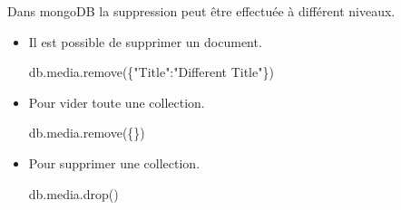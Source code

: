    Dans mongoDB la suppression peut être effectuée à différent niveaux. 
\begin{itemize}
    \item Il est possible de supprimer un document. \newline
    \begin{tt} db.media.remove(\{"Title":"Different Title"\}) \end{tt} 
    
    \item Pour vider toute une collection. \newline
    \begin{tt} db.media.remove(\{\})  \end{tt} 
  
    \item Pour supprimer une collection. \newline
    \begin{tt} db.media.drop() \end{tt} 

\end{itemize}